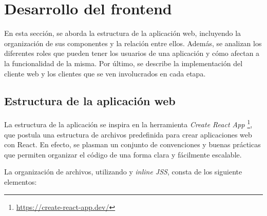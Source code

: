 \newpage
\section{Desarrollo del frontend}

En esta sección, se aborda la estructura de la aplicación web, incluyendo la organización de sus componentes y la relación entre ellos. Además, se analizan los diferentes roles que pueden tener los usuarios de una aplicación y cómo afectan a la funcionalidad de la misma. Por último, se describe la implementación del cliente web y los clientes que se ven involucrados en cada etapa. 


\subsection{Estructura de la aplicación web}

La estructura de la aplicación se inspira en la herramienta \textit{Create React App} \footnote{\url{https://create-react-app.dev/}}, que postula una estructura de archivos predefinida para crear aplicaciones web con React. En efecto, se plasman un conjunto de convenciones y buenas prácticas que permiten organizar el código de una forma clara y fácilmente escalable.

La organización de archivos, utilizando  y \textit{inline JSS}, consta de los siguiente elementos:

